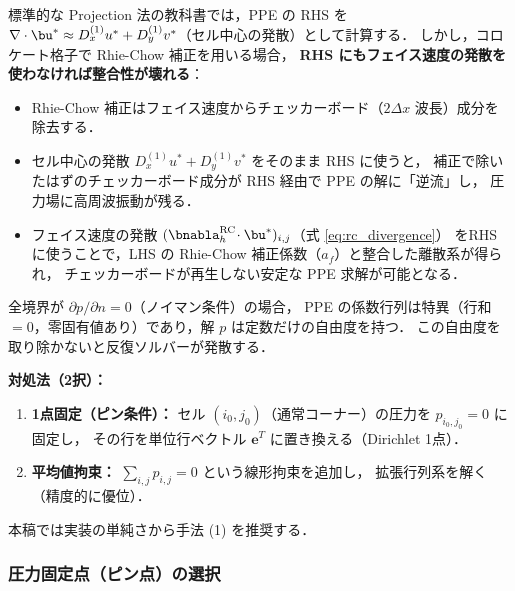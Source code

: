 \begin{tcolorbox}[warnbox, title={なぜセル中心発散でなくフェイス速度の発散を使うのか：チェッカーボードとの関係}]
標準的な Projection 法の教科書では，PPE の RHS を
$\nabla\cdot\bu^* \approx D_x^{(1)}u^* + D_y^{(1)}v^*$（セル中心の発散）として計算する．
しかし，コロケート格子で Rhie-Chow 補正を用いる場合，
\textbf{RHS にもフェイス速度の発散を使わなければ整合性が壊れる}：

\begin{itemize}
  \item Rhie-Chow 補正はフェイス速度からチェッカーボード（$2\Delta x$ 波長）成分を除去する．
  \item セル中心の発散 $D_x^{(1)}u^*+D_y^{(1)}v^*$ をそのまま RHS に使うと，
        補正で除いたはずのチェッカーボード成分が RHS 経由で PPE の解に「逆流」し，
        圧力場に高周波振動が残る．
  \item フェイス速度の発散 $(\bnabla_h^{\mathrm{RC}}\!\cdot\bu^*)_{i,j}$（式 \eqref{eq:rc_divergence}）
        をRHS に使うことで，LHS の Rhie-Chow 補正係数（$a_f$）と整合した離散系が得られ，
        チェッカーボードが再生しない安定な PPE 求解が可能となる．
\end{itemize}
\end{tcolorbox}

\begin{tcolorbox}[warnbox, title={全周ノイマン境界における零モード対策（必須）}]
全境界が $\partial p/\partial n = 0$（ノイマン条件）の場合，
PPE の係数行列は特異（行和 $= 0$，零固有値あり）であり，解 $p$ は定数だけの自由度を持つ．
この自由度を取り除かないと反復ソルバーが発散する．

\textbf{対処法（2択）：}
\begin{enumerate}
  \item \textbf{1点固定（ピン条件）：} セル $(i_0, j_0)$（通常コーナー）の圧力を $p_{i_0,j_0} = 0$ に固定し，
        その行を単位行ベクトル $\mathbf{e}^T$ に置き換える（Dirichlet 1点）．
  \item \textbf{平均値拘束：} $\sum_{i,j} p_{i,j} = 0$ という線形拘束を追加し，
        拡張行列系を解く（精度的に優位）．
\end{enumerate}
本稿では実装の単純さから手法 (1) を推奨する．
\end{tcolorbox}

\subsubsection*{圧力固定点（ピン点）の選択}
\label{sec:pinpoint}

